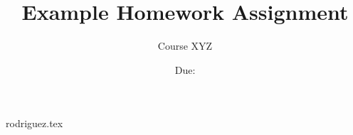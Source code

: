\documentclass[12pt]{article}
\title{Example Homework Assignment} %
\author{
Course XYZ}
\date{Due: \DTMusedate{duedate}}
\begin{document}
\maketitle

{rodriguez.tex}
\end{document}
